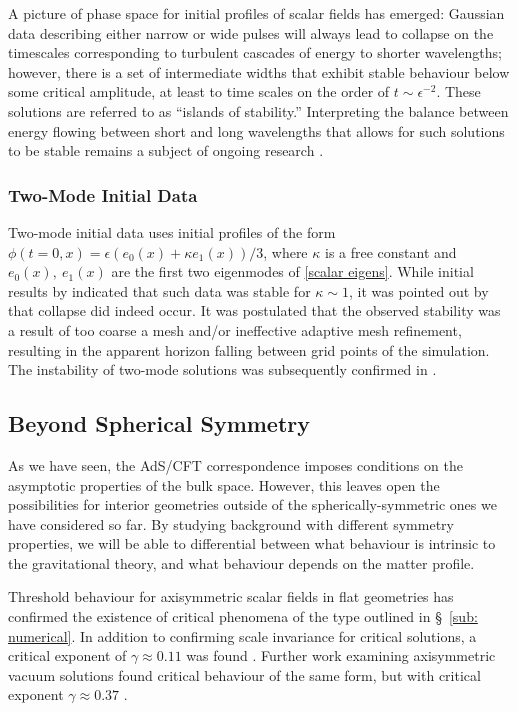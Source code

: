 \documentclass[../PhD.tex]{subfiles}
\begin{document}
A picture of phase space for initial profiles of scalar fields has emerged: Gaussian data describing either narrow or wide pulses will always lead to collapse on the timescales corresponding to turbulent cascades of energy to shorter wavelengths; however, there is a set of intermediate widths that exhibit stable behaviour below some critical amplitude, at least to time scales on the order of $t \sim \epsilon^{-2}$. These solutions are referred to as ``islands of stability.'' Interpreting the balance between energy flowing between short and long wavelengths that allows for such solutions to be stable remains a subject of ongoing research \cite{1507.08261, TTF, 1706.07413, 1912.07143}.

\subsubsection{Two-Mode Initial Data}

Two-mode initial data uses initial profiles of the form $\phi(t=0,x) = \epsilon ( e_0 (x) + \kappa e_1 (x) )/3$, where $\kappa$ is a free constant and $e_0(x), \: e_1(x)$ are the first two eigenmodes of \eqref{scalar eigens}. While initial results by \cite{1403.6471} indicated that such data was stable for $\kappa \sim 1$, it was pointed out by \cite{1410.2631} that  collapse did indeed occur. It was postulated that the observed stability was a result of too coarse a mesh and/or ineffective adaptive mesh refinement, resulting in the apparent horizon falling between grid points of the simulation. The instability of two-mode solutions was subsequently confirmed in \cite{1508.02709}.


\subsection{Beyond Spherical Symmetry}
\label{sub: beyond spherical}

As we have seen, the AdS/CFT correspondence imposes conditions on the asymptotic properties of the bulk space. However, this leaves open the possibilities for interior geometries outside of the spherically-symmetric ones we have considered so far. By studying background with different symmetry properties, we will be able to differential between what behaviour is intrinsic to the gravitational theory, and what behaviour depends on the matter profile.

Threshold behaviour for axisymmetric scalar fields in flat geometries has confirmed the existence of critical phenomena of the type outlined in \S~\!\ref{sub: numerical}. In addition to confirming scale invariance for critical solutions, a critical exponent of $\gamma \approx 0.11$ was found \cite{gr-qc/0405101}. Further work examining axisymmetric vacuum solutions found critical behaviour of the same form, but with critical exponent $\gamma \approx 0.37$ \cite{Abrahams:1993wa}.
\end{document}
